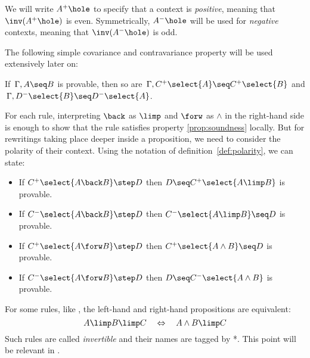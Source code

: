 \begin{definition}\label{def:polarity}
We will write $A^+\hole$ to specify that a context is {\em positive},
meaning that $\inv(A^+\hole)$ is even. Symmetrically, $A^-\hole$ will be
used for {\em negative} contexts, meaning that $\inv(A^-\hole)$ is odd.
\end{definition}
The following simple covariance and contravariance property will be used
extensively later on:
\begin{lemma}[Variance]\label{prop:cov}
  If $\, \Gamma, A\seq B$ is provable, then so are $\, \Gamma, C^+\select{A}\seq C^+\select{B}$
  and $\, \Gamma, D^-\select{B}\seq D^-\select{A}$.
\end{lemma}

For each rule, interpreting $\back$ as $\limp$ and $\forw$ as $\land$ in the
right-hand side is enough to show that the rule satisfies property
\ref{prop:soundness} locally. But for rewritings taking place deeper inside a
proposition, we need to consider the polarity of their context. Using the
notation of definition~\ref{def:polarity}, we can state:
\begin{lemma}\label{lemma:rules-valid-in-context}
  \phantom{a}
  \begin{itemize}
    \item If $C^+\select{A\back B}\step D$ then $D \seq C^+\select{A\limp B}$ is provable.
    \item If $C^-\select{A\back B} \step D$ then $C^-\select{A\limp B}\seq D$ is provable.
    \item If $C^+\select{A \forw B} \step D$ then $ C^+\select{A \land B}\seq D$ is provable.
    \item If $C^-\select{A \forw B} \step D$ then $D \seq C^-\select{A \land B}$ is provable.
  \end{itemize}
\end{lemma}
\begin{remark}
  For some rules, like , the left-hand and
  right-hand propositions are equivalent:
  $$A \limp B \limp C ~~~\Leftrightarrow~~~ A \land B \limp C$$ Such rules are
  called {\em invertible} and their names are tagged by *. This point will be
  relevant in .
\end{remark}


